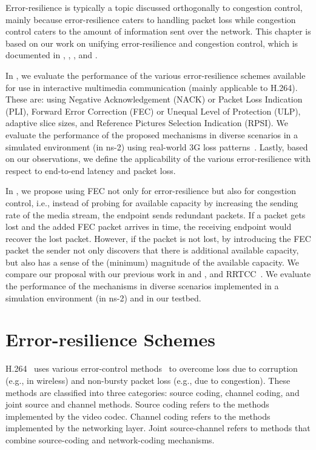 Error-resilience is typically a topic discussed orthogonally to congestion
control, mainly because error-resilience caters to handling
packet loss while congestion control caters to the amount of information sent
over the network. This chapter is based on our work on unifying
error-resilience and congestion control, which is documented in
, , \cite{draft.flex.fec}, and \cite{draft.adaptive.fec}.

In , we evaluate the performance of the various
error-resilience schemes available for use in interactive multimedia
communication (mainly applicable to H.264). These are: using Negative
Acknowledgement (NACK) or Packet Loss Indication (PLI), Forward Error
Correction (FEC) or Unequal Level of Protection (ULP), adaptive slice sizes,
and Reference Pictures Selection Indication (RPSI). We evaluate the
performance of the proposed mechanisms in diverse scenarios in a simulated
environment (in ns-2) using real-world 3G loss patterns~\cite{3gppSim}.
Lastly, based on our observations, we define the applicability of the various
error-resilience with respect to end-to-end latency and packet loss.

In , we propose using FEC not only for error-resilience but
also for congestion control, i.e., instead of probing for available capacity
by increasing the sending rate of the media stream, the endpoint sends
redundant packets. If a packet gets lost and the added FEC packet arrives in
time, the receiving endpoint would recover the lost packet. However, if the
packet is not lost, by introducing the FEC packet the sender not only
discovers that there is additional available capacity, but also has a sense of
the (minimum) magnitude of the available capacity. We compare our proposal
with our previous work in  and , and
RRTCC~\cite{draft.rrtcc}. We evaluate the performance of the
mechanisms in diverse scenarios implemented in a simulation environment (in
ns-2) and in our testbed.

\section{Error-resilience Schemes}

H.264~\cite{h264} uses various error-control methods~\cite{err_res_h264_std,
wang98error, wang00review, 310669} to overcome loss due to corruption (e.g.,
in wireless) and non-bursty packet loss (e.g., due to congestion). These
methods are classified into three categories: source coding, channel coding,
and joint source and channel methods. Source coding refers to the methods
implemented by the video codec. Channel coding refers to the methods
implemented by the networking layer. Joint source-channel refers to methods
that combine source-coding and network-coding mechanisms.

